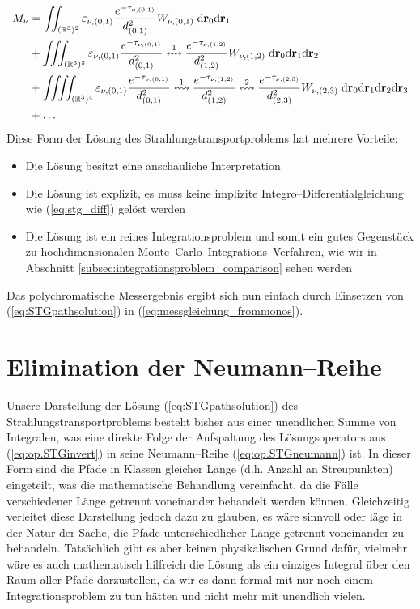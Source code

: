 	\begin{align*}
		M_\nu&=\iint_{(\mathbb{R}^3)^2}\varepsilon_{\nu,(0,1)}\frac{e^{-\tau_{\nu,(0,1)}}}{d_{(0,1)}^2} W_{\nu,(0,1)} \;\text{d}\mathbf{r}_0\text{d}\mathbf{r}_1 \\
		&+\iiint_{(\mathbb{R}^3)^3}\varepsilon_{\nu,(0,1)}\frac{e^{-\tau_{\nu,(0,1)}}}{d_{(0,1)}^2}\overset{1}{\leftrightsquigarrow}\frac{e^{-\tau_{\nu,(1,2)}}}{d_{(1,2)}^2} W_{\nu,(1,2)} \;\text{d}\mathbf{r}_0\text{d}\mathbf{r}_1\text{d}\mathbf{r}_2 \\
		&+\iiiint_{(\mathbb{R}^3)^4}\varepsilon_{\nu,(0,1)}\frac{e^{-\tau_{\nu,(0,1)}}}{d_{(0,1)}^2}\overset{1}{\leftrightsquigarrow}\frac{e^{-\tau_{\nu,(1,2)}}}{d_{(1,2)}^2}\overset{2}{\leftrightsquigarrow}\frac{e^{-\tau_{\nu,(2,3)}}}{d_{(2,3)}^2} W_{\nu,(2,3)} \;\text{d}\mathbf{r}_0\text{d}\mathbf{r}_1\text{d}\mathbf{r}_2\text{d}\mathbf{r}_3 \\
		&+\hdots
	\end{align*}
	Diese Form der Lösung des Strahlungstransportproblems hat mehrere Vorteile:
	\begin{itemize}
		\item{Die Lösung besitzt eine anschauliche Interpretation}
		\item{Die Lösung ist explizit, es muss keine implizite Integro--Differentialgleichung wie (\ref{eq:stg_diff}) gelöst werden}
		\item{Die Lösung ist ein reines Integrationsproblem und somit ein gutes Gegenstück zu hochdimensionalen Monte--Carlo--Integrations--Verfahren, wie wir in Abschnitt \ref{subsec:integrationsproblem_comparison} sehen werden}
	\end{itemize}
	Das polychromatische Messergebnis ergibt sich nun einfach durch Einsetzen von (\ref{eq:STGpathsolution}) in (\ref{eq:messgleichung_frommonos}).


	\section{Elimination der Neumann--Reihe}\label{sec:neumann_elimination}
	Unsere Darstellung der Lösung (\ref{eq:STGpathsolution}) des Strahlungstransportproblems besteht bisher aus einer unendlichen Summe von Integralen, was eine direkte Folge der Aufspaltung des Lösungsoperators aus (\ref{eq:op.STGinvert}) in seine Neumann--Reihe (\ref{eq:op.STGneumann}) ist. In dieser Form sind die Pfade in Klassen gleicher Länge (d.h. Anzahl an Streupunkten) eingeteilt, was die mathematische Behandlung vereinfacht, da die Fälle verschiedener Länge getrennt voneinander behandelt werden können. Gleichzeitig verleitet diese Darstellung jedoch dazu zu glauben, es wäre sinnvoll oder läge in der Natur der Sache, die Pfade unterschiedlicher Länge getrennt voneinander zu behandeln. Tatsächlich gibt es aber keinen physikalischen Grund dafür, vielmehr wäre es auch mathematisch hilfreich die Lösung als ein einziges Integral über den Raum aller Pfade darzustellen, da wir es dann formal mit nur noch einem Integrationsproblem zu tun hätten und nicht mehr mit unendlich vielen.
	
